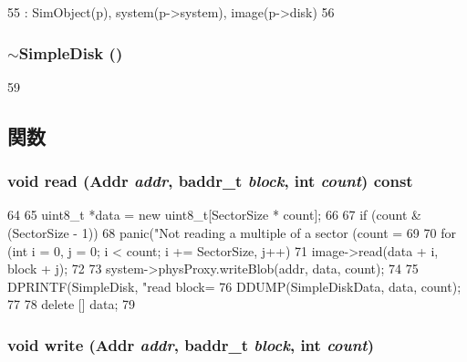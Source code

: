 \begin{DoxyCode}
55     : SimObject(p), system(p->system), image(p->disk)
56 {}
\end{DoxyCode}
\hypertarget{classSimpleDisk_ab7cd876b3ea22d054172fb927fa2733b}{
\subsubsection[{$\sim$SimpleDisk}]{\setlength{\rightskip}{0pt plus 5cm}$\sim${\bf SimpleDisk} ()}}
\label{classSimpleDisk_ab7cd876b3ea22d054172fb927fa2733b}



\begin{DoxyCode}
59 {}
\end{DoxyCode}


\subsection{関数}
\hypertarget{classSimpleDisk_a6e73fda5b9492c6dea33ce900e0682f7}{
\subsubsection[{read}]{\setlength{\rightskip}{0pt plus 5cm}void read ({\bf Addr} {\em addr}, \/  {\bf baddr\_\-t} {\em block}, \/  int {\em count}) const}}
\label{classSimpleDisk_a6e73fda5b9492c6dea33ce900e0682f7}



\begin{DoxyCode}
64 {
65     uint8_t *data = new uint8_t[SectorSize * count];
66 
67     if (count & (SectorSize - 1))
68         panic("Not reading a multiple of a sector (count = %
69 
70     for (int i = 0, j = 0; i < count; i += SectorSize, j++)
71         image->read(data + i, block + j);
72 
73     system->physProxy.writeBlob(addr, data, count);
74 
75     DPRINTF(SimpleDisk, "read  block=%
76     DDUMP(SimpleDiskData, data, count);
77 
78     delete [] data;
79 }
\end{DoxyCode}
\hypertarget{classSimpleDisk_ad6656482434fa7d0dd7496f1a70aa5ee}{
\subsubsection[{write}]{\setlength{\rightskip}{0pt plus 5cm}void write ({\bf Addr} {\em addr}, \/  {\bf baddr\_\-t} {\em block}, \/  int {\em count})}}
\label{classSimpleDisk_ad6656482434fa7d0dd7496f1a70aa5ee}



